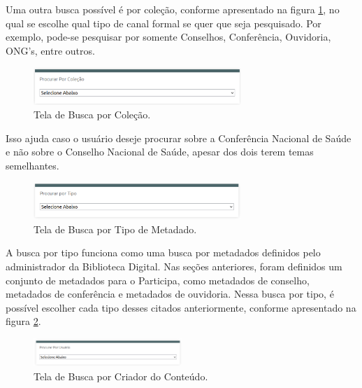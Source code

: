 Uma outra busca possível é por coleção, conforme apresentado na figura \ref{fig:buscacolecao_prototipo}, no qual se escolhe qual tipo de canal formal se quer que seja pesquisado. Por exemplo, pode-se pesquisar por somente Conselhos, Conferência, Ouvidoria, ONG’s, entre outros.

\graphicspath{{figuras/prototipo/}}
\begin{figure}[H]
\centering
\includegraphics[width=0.7\textwidth]{busca-colecao}
\caption{Tela de Busca por Coleção.}
\label{fig:buscacolecao_prototipo}
\end{figure}

Isso ajuda caso o usuário deseje procurar sobre a Conferência Nacional de Saúde e não sobre o Conselho Nacional de Saúde, apesar dos dois terem temas semelhantes.

\graphicspath{{figuras/prototipo/}}
\begin{figure}[H]
\centering
\includegraphics[width=0.7\textwidth]{busca-tipo-metadado}
\caption{Tela de Busca por Tipo de Metadado.}
\label{fig:buscatipometadado_prototipo}
\end{figure}

A busca por tipo funciona como uma busca por metadados definidos pelo administrador da Biblioteca Digital. Nas seções anteriores, foram definidos um conjunto de metadados para o Participa, como metadados de conselho, metadados de conferência e metadados de ouvidoria. Nessa busca por tipo, é possível escolher cada tipo desses citados anteriormente, conforme apresentado na figura \ref{fig:buscatipometadado_prototipo}.

\graphicspath{{figuras/prototipo/}}
\begin{figure}[H]
\centering
\includegraphics[width=0.5\textwidth]{busca-criador}
\caption{Tela de Busca por Criador do Conteúdo.}
\label{fig:buscacriador_prototipo}
\end{figure}

